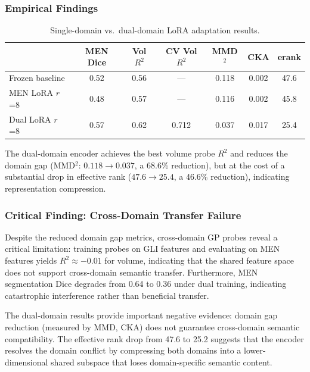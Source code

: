 \subsubsection{Empirical Findings}

\begin{table}[H]
  \centering
  \caption{Single-domain vs.\ dual-domain LoRA adaptation results.}
  \label{tab:dual_domain}
  \begin{tabular}{lcccccc}
    \toprule
    & \textbf{MEN Dice} & \textbf{Vol $R^2$} & \textbf{CV Vol $R^2$}
    & \textbf{MMD$^2$} & \textbf{CKA} & \textbf{erank} \\
    \midrule
    Frozen baseline & 0.52 & 0.56 & --- & 0.118 & 0.002 & 47.6 \\
    MEN LoRA $r$=8  & 0.48 & 0.57 & --- & 0.116 & 0.002 & 45.8 \\
    Dual LoRA $r$=8 & 0.57 & 0.62 & 0.712 & 0.037 & 0.017 & 25.4 \\
    \bottomrule
  \end{tabular}
\end{table}

The dual-domain encoder achieves the best volume probe $R^2$ and reduces the
domain gap (MMD$^2$: $0.118 \to 0.037$, a 68.6\% reduction), but at the cost
of a substantial drop in effective rank ($47.6 \to 25.4$, a 46.6\% reduction),
indicating representation compression.

\subsubsection{Critical Finding: Cross-Domain Transfer Failure}

Despite the reduced domain gap metrics, cross-domain GP probes reveal a
critical limitation: training probes on GLI features and evaluating on MEN
features yields $R^2 \approx -0.01$ for volume, indicating that the shared
feature space does not support cross-domain semantic transfer. Furthermore,
MEN segmentation Dice degrades from 0.64 to 0.36 under dual training,
indicating catastrophic interference rather than beneficial transfer.

\begin{remark}
  The dual-domain results provide important negative evidence: domain gap
  reduction (measured by MMD, CKA) does not guarantee cross-domain semantic
  compatibility. The effective rank drop from 47.6 to 25.2 suggests that the
  encoder resolves the domain conflict by compressing both domains into a
  lower-dimensional shared subspace that loses domain-specific semantic
  content.
\end{remark}

